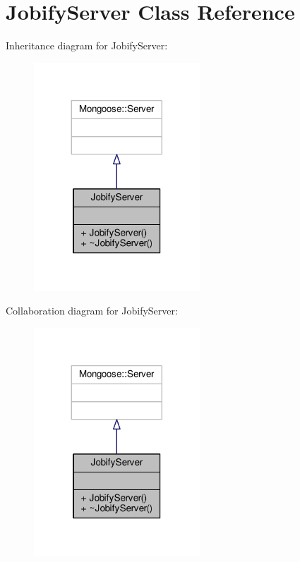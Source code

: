 \hypertarget{classJobifyServer}{}\section{Jobify\+Server Class Reference}
\label{classJobifyServer}


Inheritance diagram for Jobify\+Server\+:\nopagebreak
\begin{figure}[H]
\begin{center}
\leavevmode
\includegraphics[width=176pt]{d0/d59/classJobifyServer__inherit__graph}
\end{center}
\end{figure}


Collaboration diagram for Jobify\+Server\+:\nopagebreak
\begin{figure}[H]
\begin{center}
\leavevmode
\includegraphics[width=176pt]{df/d79/classJobifyServer__coll__graph}
\end{center}
\end{figure}
